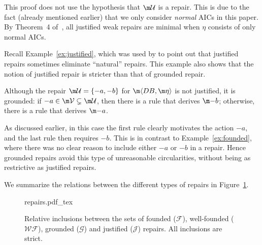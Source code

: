 This proof does not use the hypothesis that $\UU$ is a repair.
This is due to the fact (already mentioned earlier) that we only consider \emph{normal} AICs in this paper. By Theorem~4 of~\cite{tplp/CaropreseT11}, all justified weak repairs are minimal when $\eta$ consists of only normal AICs.


Recall Example~\ref{ex:justified}, which was used by \citet{tase/Cruz-FilipeEGN13} to point out that justified repairs sometimes eliminate ``natural'' repairs.
This example also shows that the notion of justified repair is stricter than that of grounded repair.
\begin{example}[Example~\ref{ex:justified} continued]
  Although the repair $\UU=\{-a,-b\}$ for $\fulldb$ is not justified, it is grounded: if ${-a}\in\VV\subsetneq\UU$, then there is a rule that derives $\remove b$; otherwise, there is a rule that derives $\remove a$. %
\end{example}
As discussed earlier, in this case the first rule clearly motivates the action $-a$, and the last rule then requires $-b$.
This is in contrast to Example~\ref{ex:founded}, where there was no clear reason to include either $-a$ or $-b$ in a repair.
Hence grounded repairs avoid this type of unreasonable circularities, without being as restrictive as justified repairs.

We summarize the relations between the different types of repairs in
Figure~\ref{fig:repairs}.
%
\begin{figure}
  \centering
  \def\svgwidth{.5\columnwidth}
  {repairs.pdf_tex}
  \caption{Relative inclusions between the sets of founded ($\mathcal F$), well-founded ($\mathcal{WF}$), grounded ($\mathcal G$) and justified ($\mathcal J$) repairs.
  All inclusions are strict.}
  \label{fig:repairs}
\end{figure}

